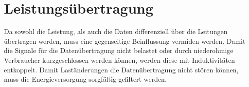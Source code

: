 \section{Leistungsübertragung}
Da sowohl die Leistung, als auch die Daten differenziell über die Leitungen 
übertragen werden, muss eine gegenseitige Beinflussung vermiden werden. Damit 
die Signale für die Datenübertragung nicht belastet oder durch niederohmige 
Verbraucher kurzgeschlossen werden können, werden diese mit Induktivitäten 
entkoppelt. Damit Laständerungen die Datenübertragung nicht stören können, 
muss die Energieversorgung sorgfältig gefiltert werden. 

